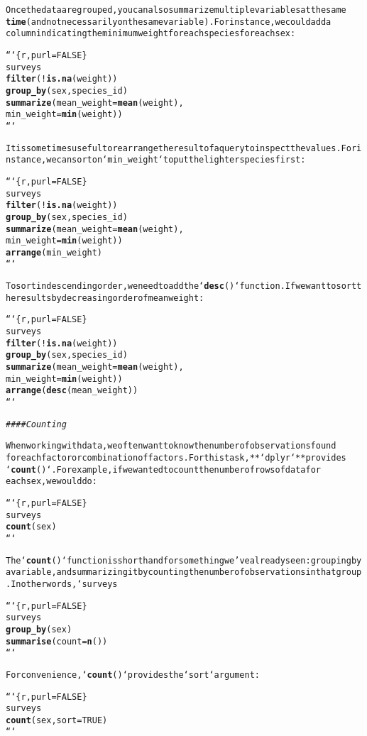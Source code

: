 \documentclass{article}\usepackage[]{graphicx}\usepackage[]{xcolor}
\makeatletter
\newcommand{\hlcom}[1]{\textcolor[rgb]{0.678,0.584,0.686}{\textit{#1}}}%
\newcommand{\hlkwd}[1]{\textcolor[rgb]{0.737,0.353,0.396}{\textbf{#1}}}%
\newenvironment{kframe}{%
 \def\at@end@of@kframe{}%
 \ifinner\ifhmode%
  \def\at@end@of@kframe{\end{minipage}}%
  \begin{minipage}{\columnwidth}%
 \fi\fi%
 \def\FrameCommand##1{\hskip\@totalleftmargin \hskip-\fboxsep
 \colorbox{shadecolor}{##1}\hskip-\fboxsep
     \hskip-\linewidth \hskip-\@totalleftmargin \hskip\columnwidth}%
 \MakeFramed {\advance\hsize-\width
   \@totalleftmargin\z@ \linewidth\hsize
   \@setminipage}}%
 {\par\unskip\endMakeFramed%
 \at@end@of@kframe}
\newenvironment{knitrout}{}{} %
\makeatother
\begin{document}
\begin{knitrout}
\begin{kframe}
\begin{alltt}
Once the data are grouped, you can also summarize multiple variables at the same
\hlkwd{time} (and not necessarily on the same variable). For instance, we could add a
column indicating the minimum weight for each species for each sex:

```\{r, purl = FALSE\}
surveys %>%
  \hlkwd{filter}(!\hlkwd{is.na}(weight)) %>%
  \hlkwd{group_by}(sex, species_id) %>%
  \hlkwd{summarize}(mean_weight = \hlkwd{mean}(weight),
            min_weight = \hlkwd{min}(weight))
```

It is sometimes useful to rearrange the result of a query to inspect the values. For instance, we can sort on `min_weight` to put the lighter species first:


```\{r, purl = FALSE\}
surveys %>%
  \hlkwd{filter}(!\hlkwd{is.na}(weight)) %>%
  \hlkwd{group_by}(sex, species_id) %>%
  \hlkwd{summarize}(mean_weight = \hlkwd{mean}(weight),
            min_weight = \hlkwd{min}(weight)) %>%
  \hlkwd{arrange}(min_weight)
```

To sort in descending order, we need to add the `\hlkwd{desc}()` function. If we want to sort the results by decreasing order of mean weight:

```\{r, purl = FALSE\}
surveys %>%
  \hlkwd{filter}(!\hlkwd{is.na}(weight)) %>%
  \hlkwd{group_by}(sex, species_id) %>%
  \hlkwd{summarize}(mean_weight = \hlkwd{mean}(weight),
            min_weight = \hlkwd{min}(weight)) %>%
  \hlkwd{arrange}(\hlkwd{desc}(mean_weight))
```


\hlcom{#### Counting}

When working with data, we often want to know the number of observations found
for each factor or combination of factors. For this task, **`dplyr`** provides
`\hlkwd{count}()`. For example, if we wanted to count the number of rows of data for
each sex, we would do:

```\{r, purl = FALSE\}
surveys %>%
    \hlkwd{count}(sex)
```

The `\hlkwd{count}()` function is shorthand for something we've already seen: grouping by a variable, and summarizing it by counting the number of observations in that group. In other words, `surveys %>% \hlkwd{count}()` is equivalent to:  

```\{r, purl = FALSE\}
surveys %>%
    \hlkwd{group_by}(sex) %>%
    \hlkwd{summarise}(count = \hlkwd{n}())
```

For convenience, `\hlkwd{count}()` provides the `sort` argument:  

```\{r, purl = FALSE\}
surveys %>%
    \hlkwd{count}(sex, sort = TRUE)
```


\end{alltt}
\end{kframe}
\end{knitrout}
\end{document}

